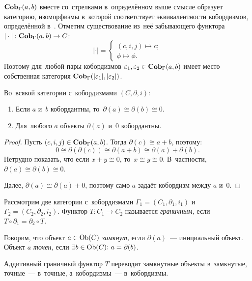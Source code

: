 \documentclass[a4paper,oneside]{article}
\begin{document}
$\mathbf{Cob}_\Gamma(a, b)$ вместе со~стрелками в~определённом выше смысле образует категорию,
изоморфизмы в~которой соответствует эквивалентности кобордизмов, определённой в~\cite{Mil65}.
Отметим существование из~неё забывающего функтора $|\cdot| : \mathbf{Cob}_\Gamma(a, b) \rightarrow C$:
$$
    | \cdot | = \begin{cases}
        (c, i, j) \mapsto c; \\
        \phi \mapsto \phi.
    \end{cases}
$$
Поэтому для~любой пары кобордизмов $\varepsilon_1, \varepsilon_2 \in \mathbf{Cob}_\Gamma(a, b)$
имеет место собственная категория $\mathbf{Cob}_\Gamma(|\varepsilon_1|, |\varepsilon_2|)$.

\begin{statement*}
    Во~всякой категории с~кобордизмами $(C, \partial, i)$:
    \begin{enumerate}
        \item Если $a$ и~$b$ кобордантны, то~$\partial(a) \cong \partial(b) \cong 0$.
        \item Для~любого $a$ объекты $\partial(a)$ и~$0$ кобордантны.
    \end{enumerate}
\end{statement*}

\begin{proof}
    Пусть $(c, i, j) \in \mathbf{Cob}_\Gamma(a, b)$. Тогда $\partial(c) \cong a + b$, поэтому:
    $$
        0 \cong \partial(\partial(c)) \cong \partial(a + b) \cong \partial(a) + \partial(b).
    $$
    Нетрудно показать, что если $x + y \cong 0$, то~$x \cong y \cong 0$.
    В~частности, $\partial(a) \cong \partial(b) \cong 0$.

    Далее, $\partial(a) \cong \partial(a) + 0$, поэтому само $a$ задаёт кобордизм между $a$ и~$0$.
\end{proof}

Рассмотрим две категории с~кобордизмами $\Gamma_1 = (C_1, \partial_1, i_1)$ и~$\Gamma_2 = (C_2, \partial_2, i_2)$.
Функтор $T : C_1 \rightarrow C_2$ называется \textit{граничным,} если $T \circ \partial_1 = \partial_2 \circ T$.

Говорим, что объект $a \in \mathrm{Ob}(C)$ \textit{замкнут,} если $\partial(a)$~— инициальный объект.
Объект $a$ \textit{точен,} если $\exists b \in \Ob(C){:}\ a = \partial(b)$.

\begin{statement*}
    Аддитивный граничный функтор $T$ переводит замкнутные объекты в~замкнутые, точные~— в~точные, а~кобордизмы~— в~кобордизмы.
\end{statement*}
\end{document}
